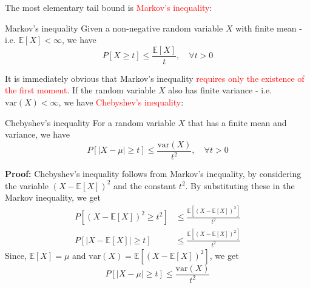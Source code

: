 \documentclass[10pt,handout,english]{beamer}
\newcommand{\E}{\mathbb{E}}
\begin{document}
\begin{frame}[allowframebreaks]
The most elementary tail bound is \textcolor{red}{Markov's inequality}:
\begin{block}{Markov's inequality}
Given a non-negative random variable $X$ with finite mean - i.e. $\E[X]<\infty$, we have
\[
P[X\geq t]\leq\frac{\E[X]}{t},\quad \forall t>0
\]
\end{block}
It is immediately obvious that Markov's inequality \textcolor{red}{requires only the existence of the first moment}. If the random variable $X$ also has finite variance - i.e. $\text{var}(X)<\infty$, we have \textcolor{red}{Chebyshev's inequality}:
\begin{block}{Chebyshev's inequality}
For a random variable $X$ that has a finite mean and variance, we have
\[
P[\lvert X-\mu \rvert\geq t]\leq\frac{\text{var}(X)}{t^2},\quad \forall t>0
\]
\end{block} 
\end{frame}
\begin{frame}

\textbf{Proof:}
Chebyshev's inequality follows from Markov's inequality, by considering the variable $(X-\E[X])^2$ and the constant $t^2$. By substituting these in the Markov inequality, we get
\begin{align}
P[(X-\E[X])^2\geq t^2]&\leq \frac{\E[(X-\E[X])^2]}{t^2}\\
P[\lvert X-\E[X] \rvert\geq t]&\leq\frac{\E[(X-\E[X])^2]}{t^2}
\end{align}
Since, $\E[X]=\mu$ and $\text{var}(X)=\E[(X-\E[X])^2]$, we get
\[
P[\lvert X-\mu \rvert\geq t]\leq\frac{\text{var}(X)}{t^2}
\]

\end{frame}
\end{document}
